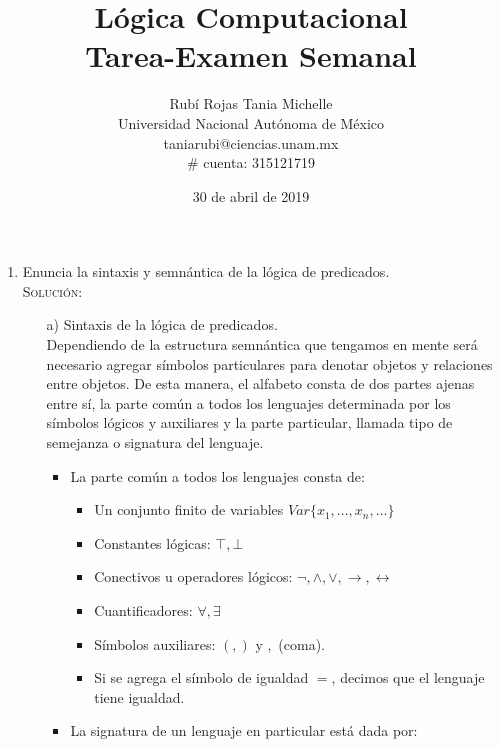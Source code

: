 \documentclass[letterpaper,11pt]{article}
\title{Lógica Computacional \\ Tarea-Examen Semanal}
\author{Rubí Rojas Tania Michelle \\
        Universidad Nacional Autónoma de México \\
        taniarubi@ciencias.unam.mx \\
        \# cuenta: 315121719
        }
\date{30 de abril de 2019}
\begin{document}
    \maketitle

    \begin{enumerate}
        \item Enuncia la sintaxis y semnántica de la lógica de predicados. \\
        \textsc{Solución:}

        \begin{itemize}
            \item[a)] Sintaxis de la lógica de predicados. \\
            Dependiendo de la estructura semnántica que tengamos en mente será
            necesario agregar símbolos particulares para denotar objetos y
            relaciones entre objetos. De esta manera, el alfabeto consta de 
            dos partes ajenas entre sí, la parte común a todos los lenguajes
            determinada por los símbolos lógicos y auxiliares y la parte 
            particular, llamada tipo de semejanza o signatura del lenguaje.

            \begin{itemize}
                \item La parte común a todos los lenguajes consta de:
                
                \begin{itemize}
                    \item Un conjunto finito de variables 
                    \texttt{$Var \{x_{1}, ..., x_{n},...\}$}
                    \item Constantes lógicas: $\top, \bot$
                    \item Conectivos u operadores lógicos: 
                    $\neg, \land, \lor, \rightarrow, \leftrightarrow$
                    \item Cuantificadores: $\forall, \exists$
                    \item Símbolos auxiliares: $(, )$ y $,$ (coma).
                    \item Si se agrega el símbolo de igualdad $=$, decimos
                    que el lenguaje tiene igualdad.
                \end{itemize}

                \item La signatura de un lenguaje en particular está dada por:
                

\end{itemize}
\end{itemize}
\end{enumerate}
\end{document}

